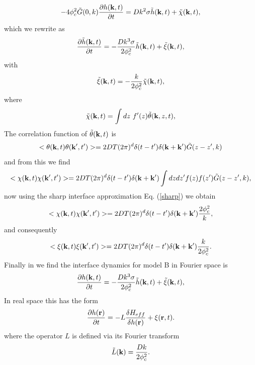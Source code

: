 \begin{equation}
    -4\phi_c^2 \tilde G(0,k) \frac{\partial h({\bf k},t)}{\partial t} = Dk^2\sigma  \tilde h({\bf k},t) + \tilde \chi({\bf k},t),
\end{equation}
which we rewrite as
\begin{equation}
    \frac{\partial \tilde h({\bf k},t)}{\partial t} = -\frac{Dk^3\sigma}{2\phi_c^2} \tilde h({\bf k},t) + \tilde \xi({\bf k},t),
\end{equation}
with 
\begin{equation}
    \tilde \xi({\bf k},t)= - \frac{k}{2\phi_c^2}\tilde \chi({\bf k},t),
\end{equation}
where 
\begin{equation}
    \tilde \chi({\bf k},t)= \int dz\  f'(z) \tilde\theta({\bf k},z,t),
\end{equation}
The correlation function of $\tilde \theta({\bf k},t)$ is 
\begin{equation}
    < \theta({\bf k},t)\theta({\bf k}',t')> = 2DT(2\pi)^d \delta(t-t') \delta({\bf k}+{\bf k'}) \tilde G(z-z',k)
\end{equation}
and from this we find 
\begin{equation}
    < \chi({\bf k},t)\chi({\bf k}',t')>  = 2DT(2\pi)^d \delta(t-t') \delta({\bf k}+{\bf k'}) \int dz dz' f(z) f(z') \tilde G(z-z',k),
    \label{bstep2}
\end{equation}
now using the sharp interface approximation Eq. (\ref{sharp}) we obtain
\begin{equation}
    < \chi({\bf k},t)\chi({\bf k}',t')>  = 2DT(2\pi)^d \delta(t-t') \delta({\bf k}+{\bf k'}) \frac{2\phi_c^2}{k},
\end{equation}
and consequently
\begin{equation}
    < \xi({\bf k},t)\xi({\bf k}',t')> = 2DT(2\pi)^d \delta(t-t') \delta({\bf k}+{\bf k'}) \frac{k}{  2\phi_c^2}.
\end{equation}
Finally in we find the interface dynamics for model B in Fourier space is
\begin{equation}
    \frac{\partial h({\bf k},t)}{\partial t} = -\frac{Dk^3\sigma}{2\phi_c^2} \tilde h({\bf k},t) + \tilde \xi({\bf k},t),
    \label{modBFT}
\end{equation}
In real space this has the form
\begin{equation}
    \frac{\partial h({\bf r})}{\partial t}= -L \frac{\delta H_{eff}}{\delta h ({\bf r})} + \xi({\bf r},t).
\end{equation}
where the operator $L$ is defined via its Fourier transform
\begin{equation}
    \tilde L({\bf k}) = \frac{Dk}{2\phi_c^2}.
\end{equation}
